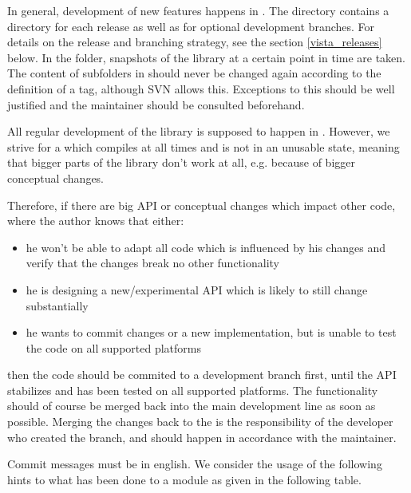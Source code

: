 In general, development of new features happens in .
The  directory contains a directory for each  release as well as for optional development branches. 
For details on the release and branching strategy, see the section \ref{vista_releases} below.
In the  folder, snapshots of the library at a certain point in time are taken.
The content of subfolders in  should never be changed again according to the definition of a tag, although SVN allows this.
Exceptions to this should be well justified and the maintainer should be consulted beforehand.

All regular development of the library is supposed to happen in .
However, we strive for a  which compiles at all times and is not in an unusable state, meaning that bigger parts of the library don't work at all, e.g. because of bigger conceptual changes.

Therefore, if there are big API or conceptual changes which impact other code, where the author knows that either:

\begin{itemize}
\item he won't be able to adapt all code which is influenced by his changes and verify that the changes break no other functionality
\item he is designing a new/experimental API which is likely to still change substantially
\item he wants to commit changes or a new implementation, but is unable to test the code on all supported platforms
\end{itemize}

then the code should be commited to a development branch first, until the API stabilizes and has been tested on all supported platforms.
The functionality should of course be merged back into the main development line as soon as possible.
Merging the changes back to the  is the responsibility of the developer who created the branch, and should happen in accordance with the  maintainer.

Commit messages must be in english.
We consider the usage of the following hints to what has been done to a module as given in the following table.

